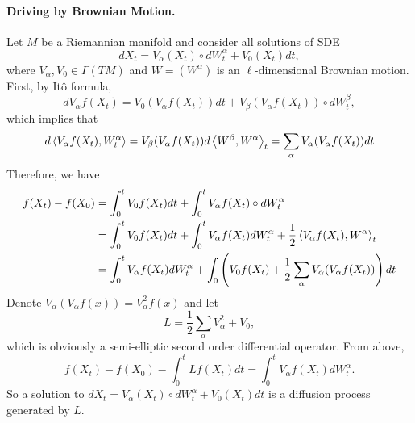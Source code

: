 \paragraph{Driving by Brownian Motion.}

Let $M$ be a Riemannian manifold and consider all solutions of SDE
\begin{equation*}
    dX_t = V_\alpha(X_t) \circ dW^\alpha_t + V_0(X_t)dt,
\end{equation*}
where $V_\alpha,V_0 \in \Gamma(TM)$ and $W=(W^\alpha)$ is an $\ell$-dimensional Brownian motion. First, by It\^o formula, 
\begin{equation*}
    d V_\alpha f(X_t) = V_0(V_\alpha f(X_t))dt + V_\beta(V_\alpha f(X_t))\circ dW^\beta_t,
\end{equation*}
which implies that
\begin{equation*}
    d \left\langle V_\alpha f(X_t),W^\alpha_t \right\rangle =  V_\beta(V_\alpha f(X_t)) d\left\langle W^\beta,W^\alpha \right\rangle_t = \sum_\alpha V_\alpha(V_\alpha f(X_t))dt
\end{equation*}
Therefore, we have
\begin{align*}
    f(X_t) - f(X_0) &=  \int_0^t V_0f(X_t)dt + \int_0^t V_\alpha f(X_t) \circ dW^\alpha_t \\
    &= \int_0^t V_0f(X_t)dt + \int_0^t V_\alpha f(X_t) dW^\alpha_t + \frac{1}{2}\left\langle V_\alpha f(X_t),W^\alpha \right\rangle_t \\
    &= \int_0^t V_\alpha f(X_t) dW^\alpha_t + \int_0 \left(V_0f(X_t) + \frac{1}{2}\sum_\alpha V_\alpha(V_\alpha f(X_t))\right) dt
\end{align*}
Denote $V_\alpha(V_\alpha f(x)) = V_\alpha^2 f(x)$ and let
\begin{equation*}
    L = \frac{1}{2}\sum_\alpha V_\alpha^2 + V_0,
\end{equation*}
which is obviously a semi-elliptic second order differential operator. From above,
\begin{equation*}
    f(X_t) - f(X_0) - \int_0^t Lf(X_t)dt = \int_0^t V_\alpha f(X_t) dW^\alpha_t.
\end{equation*}
So a solution to $dX_t = V_\alpha(X_t) \circ dW^\alpha_t + V_0(X_t)dt$ is a diffusion process generated by $L$. 


